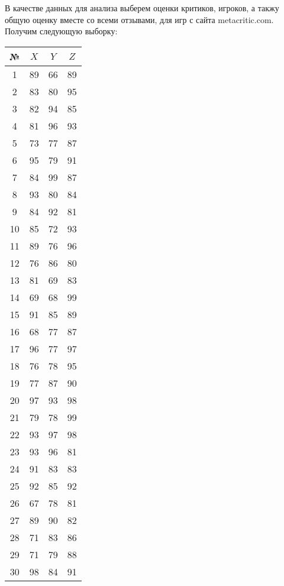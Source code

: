 \documentclass[utf8, a4paper, 14pt, russian, oneside]{book}
\begin{document}


\tableofcontents
\newpage


В качестве данных для анализа выберем оценки критиков, игроков, а такжу общую оценку вместе со всеми отзывами, для игр с сайта metacritic.com. Получим следующую выборку:
\begin{table}[h!]
    \centering
    \begin{tabular}{|c|c|c|c|}
        \hline
        № & $X$ & $Y$ & $Z$ \\ \hline
        1 & 89 & 66 & 89  \\ \hline
        2 & 83 & 80 & 95  \\ \hline
        3 & 82 & 94 & 85  \\ \hline
        4 & 81 & 96 & 93  \\ \hline
        5 & 73 & 77 & 87  \\ \hline
        6 & 95 & 79 & 91  \\ \hline
        7 & 84 & 99 & 87  \\ \hline
        8 & 93 & 80 & 84  \\ \hline
        9 & 84 & 92 & 81  \\ \hline
        10 & 85 & 72 & 93 \\ \hline
        11 & 89 & 76 & 96 \\ \hline
        12 & 76 & 86 & 80 \\ \hline
        13 & 81 & 69 & 83 \\ \hline
        14 & 69 & 68 & 99 \\ \hline
        15 & 91 & 85 & 89 \\ \hline
        16 & 68 & 77 & 87 \\ \hline
        17 & 96 & 77 & 97 \\ \hline
        18 & 76 & 78 & 95 \\ \hline
        19 & 77 & 87 & 90 \\ \hline
        20 & 97 & 93 & 98 \\ \hline
        21 & 79 & 78 & 99 \\ \hline
        22 & 93 & 97 & 98 \\ \hline
        23 & 93 & 96 & 81 \\ \hline
        24 & 91 & 83 & 83 \\ \hline
        25 & 92 & 85 & 92 \\ \hline
        26 & 67 & 78 & 81 \\ \hline
        27 & 89 & 90 & 82 \\ \hline
        28 & 71 & 83 & 86 \\ \hline
        29 & 71 & 79 & 88 \\ \hline
        30 & 98 & 84 & 91 \\ \hline
    \end{tabular} 
\end{table}
\end{document}
